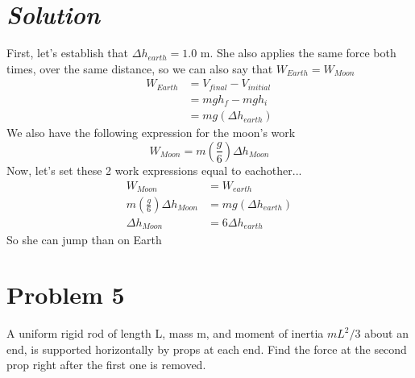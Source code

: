 \documentclass{article}
\begin{document}
\section*{\textit{Solution}} 
First, let's establish that $\Delta h_{earth} = 1.0$ m. She also applies the same force both times, over the same distance, so we can also say that $W_{Earth} = W_{Moon}$
\begin{align}
	W_{Earth} &= V_{final} - V_{initial} \\
	&= mgh_f - mgh_i \\ 
	&= mg(\Delta h_{earth})
\end{align}
We also have the following expression for the moon's work
\[ W_{Moon} = m \left( \frac{g}{6} \right) \Delta h_{Moon} \]
Now, let's set these 2 work expressions equal to eachother...
\begin{align}
	W_{Moon} &= W_{earth} \\ 
	m \left( \frac{g}{6} \right) \Delta h_{Moon} &= mg(\Delta h_{earth}) \\
	\Delta h_{Moon} &= 6 \Delta h_{earth}
\end{align}
So she can jump  than on Earth

\section*{Problem 5} 
A uniform rigid rod of length L, mass m, and moment of inertia $mL^2/3$ about an end, is supported horizontally by props at each end. Find the force at the second prop right after the first one is removed.
\end{document}
